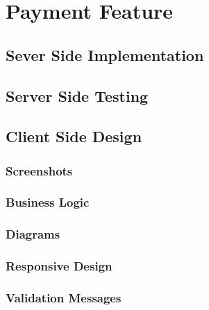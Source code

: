 \chapter{Payment Feature}
\label{chap:payment-feature}

\section{Sever Side Implementation}
\label{sec:server-side-implementation}

\section{Server Side Testing}
\label{sec:server-side-testing}

\section{Client Side Design}
\label{sec:client-side-design}

\subsection{Screenshots}
\label{subsec:screenshots}

\subsection{Business Logic}
\label{subsec:business-logic}

\subsection{Diagrams}
\label{subsec:diagrams}

\subsection{Responsive Design}
\label{subsec:responsive-design}

\subsection{Validation Messages}
\label{subsec:validation-messages}
